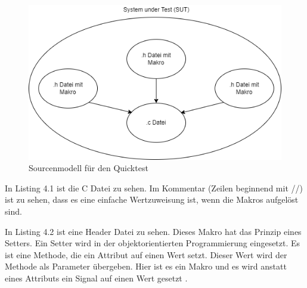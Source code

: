 \begin{figure}[h]
\centering
\includegraphics[scale=.6,]{Bilder/Quicktest/Makros.drawio.png}
\caption{Sourcenmodell für den Quicktest}
\end{figure}


In Listing 4.1 ist die C Datei zu sehen. Im Kommentar (Zeilen beginnend mit //) ist zu sehen, 
dass es eine einfache Wertzuweisung ist, wenn die Makros aufgelöst sind.\par

In Listing 4.2 ist eine Header Datei zu sehen. Dieses Makro hat das Prinzip eines Setters. Ein Setter wird in der
objektorientierten Programmierung eingesetzt. Es ist eine Methode, die ein Attribut auf einen Wert setzt. Dieser Wert
wird der Methode als Parameter übergeben. Hier ist es ein Makro und es wird anstatt eines Attributs ein Signal auf einen
Wert gesetzt \cite[vgl.][S. 414 f.]{java}.

